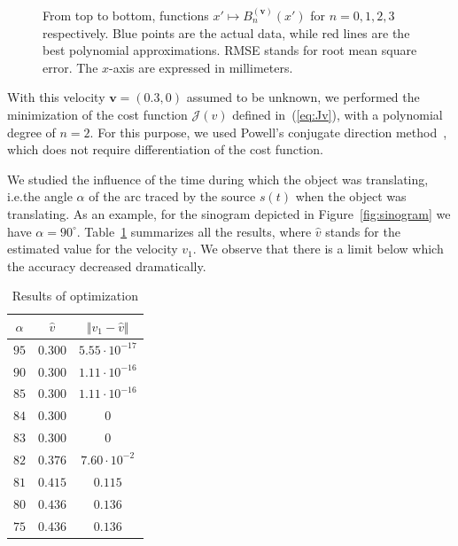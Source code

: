 \documentclass[letterpaper,twocolumn]{IEEEtran}
\newcommand{\ie}{i.e.}
\newcommand{\bv}{\mathbf{v}}
\newcommand{\Bnv}{B_n^{(\bv)}}
\begin{document}
\begin{figure}
\begin{tabular}{cc}
	\end{tabular}
	\caption{From top to bottom, functions $x' \mapsto \Bnv(x')$ for $n = 0,1,2,3$ respectively. Blue points are the actual data, while red lines are the best polynomial approximations. RMSE stands for root mean square error. The $x$-axis are expressed in millimeters.\label{fig:Bnx}}
\end{figure}

With this velocity $\bv = (0.3,0)$ assumed to be unknown, we performed the minimization of the cost function $\mathcal{J}(v)$ defined in~(\ref{eq:Jv}), with a polynomial degree of $n = 2$. For this purpose, we used Powell's conjugate direction method~\cite{powell1964efficient}, which does not require differentiation of the cost function.

We studied the influence of the time during which the object was translating, \ie the angle $\alpha$ of the arc traced by the source $s(t)$ when the object was translating. As an example, for the sinogram depicted in Figure~\ref{fig:sinogram} we have $\alpha = 90^{\circ}$. Table~\ref{tab:results} summarizes all the results, where $\hat{v}$ stands for the estimated value for the velocity $v_1$. We observe that there is a limit below which the accuracy decreased dramatically.

\begin{table}[!ht]
\caption{Results of optimization \label{tab:results}}
\centering
	\begin{tabular}{ccc}
	  $\alpha$ & $\hat{v}$ & $\Vert v_1 - \hat{v}\Vert$ \\
	  \hline
		$95$ & $0.30$0 & $5.55 \cdot 10^{-17}$ \\
		$90$ & $0.300$ & $1.11 \cdot 10^{-16}$ \\
		$85$ & $0.300$ & $1.11 \cdot 10^{-16}$ \\
		$84$ & $0.300$ & $0$ \\
		$83$ & $0.300$ & $0$ \\
		$82$ & $0.376$ & $7.60 \cdot 10^{-2}$ \\
		$81$ & $0.415$ & $0.115$ \\
		$80$ & $0.436$ & $0.136$ \\
		$75$ & $0.436$ & $0.136$
\end{tabular}
\end{table}
\end{document}
